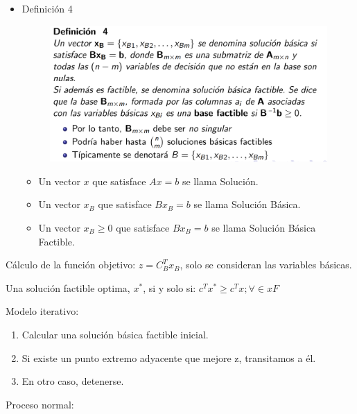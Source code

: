 \documentclass[12pt, twoside, openright]{report} %
\begin{document}
    \begin{itemize}
    \item
      Definición 4
	  \begin{figure}[H]
		{\includegraphics[scale=.3]{Untitled 10.png}}
	\end{figure}
	  \begin{itemize}
		  \item Un vector \(x\) que satisface \(Ax=b\) se llama Solución.
		  \item Un vector \(x_B\) que satisface \(Bx_B=b\) se llama Solución Básica.
		  \item Un vector \(x_B \geq 0\) que satisface \(Bx_B=b\) se llama Solución Básica Factible.
	  \end{itemize}
    \end{itemize}

	
    Cálculo de la función objetivo: \(z=C_B^Tx_B\), solo se consideran
    las variables básicas.

	Una solución factible optima, \(x^*\), si y solo si:
    \(c^Tx^* \geq c^Tx; \forall \in xF\)

	Modelo iterativo:

    \begin{enumerate}
    \def\labelenumi{\arabic{enumi}.}
  
    \item
      Calcular una solución básica factible inicial.
    \item
      Si existe un punto extremo adyacente que mejore z, transitamos a
      él.
    \item
      En otro caso, detenerse.
    \end{enumerate}
\pagebreak
	Proceso normal:
\end{document}
